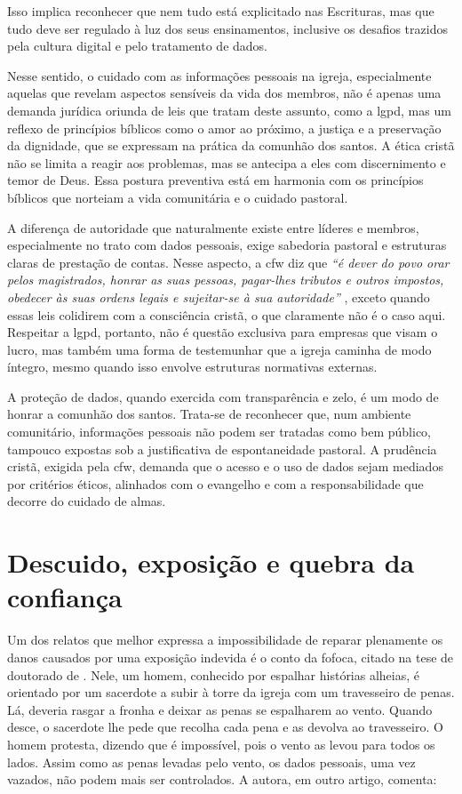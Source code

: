 Isso implica reconhecer que nem tudo está explicitado nas Escrituras, mas que tudo deve ser regulado à luz dos seus ensinamentos, inclusive os desafios trazidos pela cultura digital e pelo tratamento de dados.

Nesse sentido, o cuidado com as informações pessoais na igreja, especialmente aquelas que revelam aspectos sensíveis da vida dos membros, não é apenas uma demanda jurídica oriunda de leis que tratam deste assunto, como a \gls{lgpd}, mas um reflexo de princípios bíblicos como o amor ao próximo, a justiça e a preservação da dignidade, que se expressam na prática da comunhão dos santos. A ética cristã não se limita a reagir aos problemas, mas se antecipa a eles com discernimento e temor de Deus. Essa postura preventiva está em harmonia com os princípios bíblicos que norteiam a vida comunitária e o cuidado pastoral.

A diferença de autoridade que naturalmente existe entre líderes e membros, especialmente no trato com dados pessoais, exige sabedoria pastoral e estruturas claras de prestação de contas. Nesse aspecto, a \gls{cfw} diz que \textit{``é dever do povo orar pelos magistrados, honrar as suas pessoas, pagar-lhes tributos e outros impostos, obedecer às suas ordens legais e sujeitar-se à sua autoridade''} \cite[Cap.~XXIII]{cfw}, exceto quando essas leis colidirem com a consciência cristã, o que claramente não é o caso aqui. Respeitar a \gls{lgpd}, portanto, não é questão exclusiva para empresas que visam o lucro, mas também uma forma de testemunhar que a igreja caminha de modo íntegro, mesmo quando isso envolve estruturas normativas externas.

A proteção de dados, quando exercida com transparência e zelo, é um modo de honrar a comunhão dos santos. Trata-se de reconhecer que, num ambiente comunitário, informações pessoais não podem ser tratadas como bem público, tampouco expostas sob a justificativa de espontaneidade pastoral. A prudência cristã, exigida pela \gls{cfw}, demanda que o acesso e o uso de dados sejam mediados por critérios éticos, alinhados com o evangelho e com a responsabilidade que decorre do cuidado de almas.

\section{Descuido, exposição e quebra da confiança}

Um dos relatos que melhor expressa a impossibilidade de reparar plenamente os danos causados por uma exposição indevida é o conto da fofoca, citado na tese de doutorado de . Nele, um homem, conhecido por espalhar histórias alheias, é orientado por um sacerdote a subir à torre da igreja com um travesseiro de penas. Lá, deveria rasgar a fronha e deixar as penas se espalharem ao vento. Quando desce, o sacerdote lhe pede que recolha cada pena e as devolva ao travesseiro. O homem protesta, dizendo que é impossível, pois o vento as levou para todos os lados. Assim como as penas levadas pelo vento, os dados pessoais, uma vez vazados, não podem mais ser controlados. A autora, em outro artigo, comenta:

